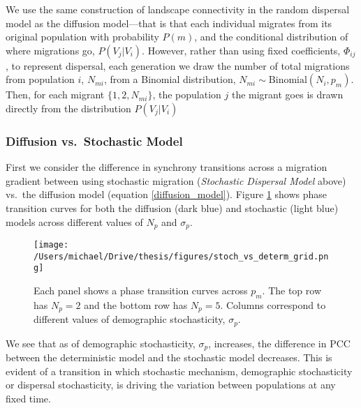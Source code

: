 We use the same construction of landscape connectivity in the random
dispersal model as the diffusion model---that is that each individual
migrates from its original population with probability \(P(m)\), and the
conditional distribution of where migrations go, \(P(V_j|V_i)\).
However, rather than using fixed coefficients, \(\Phi_{ij}\), to
represent dispersal, each generation we draw the number of total
migrations from population \(i\), \(N_{mi}\), from a Binomial
distribution, \(N_{mi} \sim \text{Binomial}(N_i,p_m)\). Then, for each
migrant \(\{1,2,N_{mi}\}\), the population \(j\) the migrant goes is
drawn directly from the distribution \(P(V_j|V_i)\)

\hypertarget{diffusion-vs.-stochastic-model}{%
\subsubsection{Diffusion vs.~Stochastic
Model}\label{diffusion-vs.-stochastic-model}}

First we consider the difference in synchrony transitions across a
migration gradient between using stochastic migration (\emph{Stochastic
Dispersal Model} above) vs.~the diffusion model (equation
\ref{diffusion_model}). Figure \ref{stoch_vs_determ_grid} shows phase
transition curves for both the diffusion (dark blue) and stochastic
(light blue) models across different values of \(N_p\) and \(\sigma_p\).

\begin{figure}[h]

\texttt{[image: /Users/michael/Drive/thesis/figures/stoch\_vs\_determ\_grid.png]}

\caption{Each panel shows a phase transition curves across $p_m$. The top row has $N_p=2$ and the bottom row has $N_p=5$. Columns correspond to different values of demographic stochasticity, $\sigma_p$. }

\label{stoch_vs_determ_grid}

\end{figure}

We see that as of demographic stochasticity, \(\sigma_p\), increases,
the difference in PCC between the deterministic model and the stochastic
model decreases. This is evident of a transition in which stochastic
mechanism, demographic stochasticity or dispersal stochasticity, is
driving the variation between populations at any fixed time.

